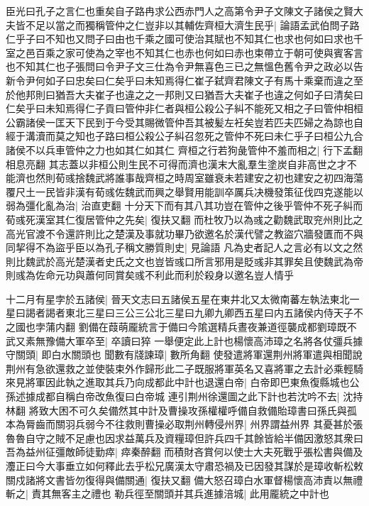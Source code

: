 臣光曰孔子之言仁也重矣自子路冉求公西赤門人之高第令尹子文陳文子諸侯之賢大夫皆不足以當之而獨稱管仲之仁豈非以其輔佐齊桓大濟生民乎|{
	論語孟武伯問子路仁乎子曰不知也又問子曰由也千乘之國可使治其賦也不知其仁也求也何如曰求也千室之邑百乘之家可使為之宰也不知其仁也赤也何如曰赤也束帶立于朝可使與賓客言也不知其仁也子張問曰令尹子文三仕為令尹無喜色三已之無慍色舊令尹之政必以告新令尹何如子曰忠矣曰仁矣乎曰未知焉得仁崔子弑齊君陳文子有馬十乘棄而違之至於他邦則曰猶吾大夫崔子也違之之一邦則又曰猶吾大夫崔子也違之何如子曰清矣曰仁矣乎曰未知焉得仁子貢曰管仲非仁者與桓公殺公子糾不能死又相之子曰管仲相桓公霸諸侯一匡天下民到于今受其賜微管仲吾其被髪左衽矣豈若匹夫匹婦之為諒也自經于溝瀆而莫之知也子路曰桓公殺公子糾召忽死之管仲不死曰未仁乎子曰桓公九合諸侯不以兵車管仲之力也如其仁如其仁}
齊桓之行若狗彘管仲不羞而相之|{
	行下孟翻相息亮翻}
其志蓋以非桓公則生民不可得而濟也漢末大亂羣生塗炭自非高世之才不能濟也然則荀彧捨魏武將誰事哉齊桓之時周室雖衰未若建安之初也建安之初四海蕩覆尺土一民皆非漢有荀彧佐魏武而興之舉賢用能訓卒厲兵决機發策征伐四克遂能以弱為彊化亂為治|{
	治直吏翻}
十分天下而有其八其功豈在管仲之後乎管仲不死子糾而荀彧死漢室其仁復居管仲之先矣|{
	復扶又翻}
而杜牧乃以為彧之勸魏武取兖州則比之高光官渡不令還許則比之楚漢及事就功畢乃欲邀名於漢代譬之教盜穴牆發匱而不與同挈得不為盜乎臣以為孔子稱文勝質則史|{
	見論語}
凡為史者記人之言必有以文之然則比魏武於高光楚漢者史氏之文也豈皆彧口所言邪用是貶彧非其罪矣且使魏武為帝則彧為佐命元功與蕭何同賞矣彧不利此而利於殺身以邀名豈人情乎

十二月有星孛於五諸侯|{
	晉天文志曰五諸侯五星在東井北又太微南蕃左執法東北一星曰謁者謁者東北三星曰三公三公北三星曰九卿九卿西五星曰内五諸侯内侍天子不之國也孛蒲内翻}
劉備在葭萌龎統言于備曰今隂選精兵晝夜兼道徑襲成都劉璋既不武又素無豫備大軍卒至|{
	卒讀曰猝}
一舉便定此上計也楊懷高沛璋之名將各仗彊兵據守關頭|{
	即白水關頭也}
聞數有牋諫璋|{
	數所角翻}
使發遣將軍還荆州將軍遣與相聞說荆州有急欲還救之並使裝束外作歸形此二子既服將軍英名又喜將軍之去計必乘輕騎來見將軍因此執之進取其兵乃向成都此中計也退還白帝|{
	白帝即巴東魚復縣城也公孫述據成都自稱白帝改魚復曰白帝城}
連引荆州徐還圖之此下計也若沈吟不去|{
	沈持林翻}
將致大困不可久矣備然其中計及曹操攻孫權權呼備自救備貽璋書曰孫氏與孤本為脣齒而關羽兵弱今不往救則曹操必取荆州轉侵州界|{
	州界謂益州界}
其憂甚於張魯魯自守之賊不足慮也因求益萬兵及資糧璋但許兵四千其餘皆給半備因激怒其衆曰吾為益州征彊敵師徒勤瘁|{
	瘁秦醉翻}
而積財吝賞何以使士大夫死戰乎張松書與備及灋正曰今大事垂立如何釋此去乎松兄廣漢太守肅恐禍及已因發其謀於是璋收斬松敕關戍諸將文書皆勿復得與備關通|{
	復扶又翻}
備大怒召璋白水軍督楊懷高沛責以無禮斬之|{
	責其無客主之禮也}
勒兵徑至關頭并其兵進據涪城|{
	此用龎統之中計也}


